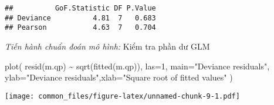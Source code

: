 \documentclass[
]{article}
\newenvironment{Shaded}{\begin{snugshade}}{\end{snugshade}}
\newcommand{\AttributeTok}[1]{\textcolor[rgb]{0.77,0.63,0.00}{#1}}
\newcommand{\ConstantTok}[1]{\textcolor[rgb]{0.00,0.00,0.00}{#1}}
\newcommand{\DecValTok}[1]{\textcolor[rgb]{0.00,0.00,0.81}{#1}}
\newcommand{\FunctionTok}[1]{\textcolor[rgb]{0.00,0.00,0.00}{#1}}
\newcommand{\NormalTok}[1]{#1}
\newcommand{\OtherTok}[1]{\textcolor[rgb]{0.56,0.35,0.01}{#1}}
\newcommand{\SpecialCharTok}[1]{\textcolor[rgb]{0.00,0.00,0.00}{#1}}
\newcommand{\StringTok}[1]{\textcolor[rgb]{0.31,0.60,0.02}{#1}}
\begin{document}
\begin{Shaded}
\end{Shaded}

\begin{verbatim}
##          GoF.Statistic DF P.Value
## Deviance          4.81  7   0.683
## Pearson           4.63  7   0.704
\end{verbatim}

\emph{Tiến hành chuẩn đoán mô hình:} Kiểm tra phần dư GLM

\begin{Shaded}
\begin{Highlighting}[]
\FunctionTok{plot}\NormalTok{( }\FunctionTok{resid}\NormalTok{(m.qp) }\SpecialCharTok{\textasciitilde{}} \FunctionTok{sqrt}\NormalTok{(}\FunctionTok{fitted}\NormalTok{(m.qp)), }\AttributeTok{las=}\DecValTok{1}\NormalTok{, }\AttributeTok{main=}\StringTok{"Deviance residuals"}\NormalTok{, }\AttributeTok{ylab=}\StringTok{"Deviance residuals"}\NormalTok{,}\AttributeTok{xlab=}\StringTok{"Square root of fitted values"}\NormalTok{ )}
\end{Highlighting}
\end{Shaded}

\texttt{[image: common\_files/figure-latex/unnamed-chunk-9-1.pdf]}
\end{document}
